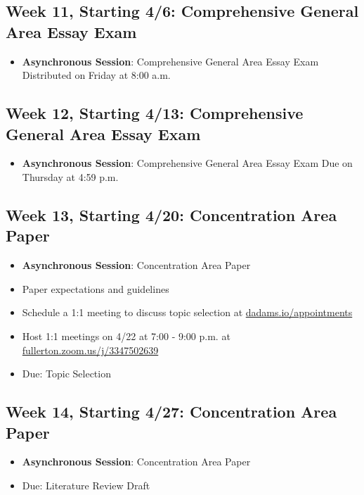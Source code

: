 \documentclass[12pt, letterpaper]{article}
\begin{document}
\subsection*{Week 11, Starting 4/6: Comprehensive General Area Essay Exam}
\begin{itemize}
    \item \textbf{Asynchronous Session}: Comprehensive General Area Essay Exam Distributed on Friday at 8:00 a.m.
\end{itemize}

\subsection*{Week 12, Starting 4/13: Comprehensive General Area Essay Exam}
\begin{itemize}
    \item \textbf{Asynchronous Session}: Comprehensive General Area Essay Exam Due on Thursday at 4:59 p.m.
\end{itemize}

\subsection*{Week 13, Starting 4/20: Concentration Area Paper}
\begin{itemize}
    \item \textbf{Asynchronous Session}: Concentration Area Paper
    \item Paper expectations and guidelines 
    \item Schedule a 1:1 meeting to discuss topic selection at \href{https://dadams.io/appointments}{dadams.io/appointments}
    \item Host 1:1 meetings on 4/22 at 7:00 - 9:00 p.m. at \href{https://fullerton.zoom.us/j/3347502639}{fullerton.zoom.us/j/3347502639}
    \item Due: Topic Selection
\end{itemize}

\subsection*{Week 14, Starting 4/27: Concentration Area Paper}
\begin{itemize}
    \item \textbf{Asynchronous Session}: Concentration Area Paper
    \item Due: Literature Review Draft
\end{itemize}
\end{document}
